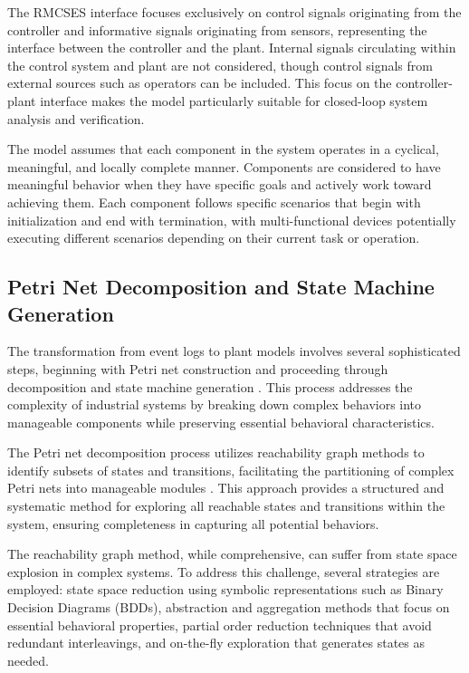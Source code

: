 The RMCSES interface focuses exclusively on control signals originating from the controller and informative signals originating from sensors, representing the interface between the controller and the plant. Internal signals circulating within the control system and plant are not considered, though control signals from external sources such as operators can be included. This focus on the controller-plant interface makes the model particularly suitable for closed-loop system analysis and verification.

The model assumes that each component in the system operates in a cyclical, meaningful, and locally complete manner. Components are considered to have meaningful behavior when they have specific goals and actively work toward achieving them. Each component follows specific scenarios that begin with initialization and end with termination, with multi-functional devices potentially executing different scenarios depending on their current task or operation.

\subsection{Petri Net Decomposition and State Machine Generation}

The transformation from event logs to plant models involves several sophisticated steps, beginning with Petri net construction and proceeding through decomposition and state machine generation \cite{van2013discovering}. This process addresses the complexity of industrial systems by breaking down complex behaviors into manageable components while preserving essential behavioral characteristics.

The Petri net decomposition process utilizes reachability graph methods to identify subsets of states and transitions, facilitating the partitioning of complex Petri nets into manageable modules \cite{buchholz2002hierarchical}. This approach provides a structured and systematic method for exploring all reachable states and transitions within the system, ensuring completeness in capturing all potential behaviors.

The reachability graph method, while comprehensive, can suffer from state space explosion in complex systems. To address this challenge, several strategies are employed: state space reduction using symbolic representations such as Binary Decision Diagrams (BDDs), abstraction and aggregation methods that focus on essential behavioral properties, partial order reduction techniques that avoid redundant interleavings, and on-the-fly exploration that generates states as needed.

